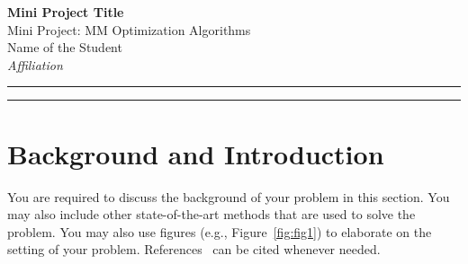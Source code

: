 \documentclass[journal,onecolumn]{IEEEtran}
\begin{document}
	
	\begin{center}
		{\Large \textbf{Mini Project Title}}\\
		\vspace{1em}
		{\large Mini Project: MM Optimization Algorithms}\\
		\vspace{1em}
		{\large Name of the Student}\\
		\vspace{1em}
		\textit{Affiliation}
	\end{center}
	

	\begin{center}
		\rule{\textwidth}{0.2mm}
		\vspace{1mm}
	\end{center}		

	\begin{abstract}
	
You are supposed to apply the idea of the MM principle in an application domain in your own choice. Your dissemination in this report should contain at least details related to 1) Background and Introduction 2) Problem Formulation 3) Application of MM Principle 4) Results and Discussion and 5) References. We suggest the report be limited to no more than 3 pages.
	
The abstract should briefly describe the essence of the problem you consider in this report. In addition highlight, in what aspects the MM algorithms can be favorable compared to the other methods when solving the same problem.
	
	\end{abstract}

	\begin{center}
		\rule{\textwidth}{0.2mm}
	\end{center}		

	\vspace{5mm}
	

\section{Background and Introduction}
 

You are required to discuss the background of your problem in this section. You may also include other state-of-the-art methods that are used to solve the problem. You may also use figures (e.g., Figure~\ref{fig:fig1}) to elaborate on the setting of your problem. References~\cite{Kenneth-2016} can be cited whenever needed.
\end{document}
